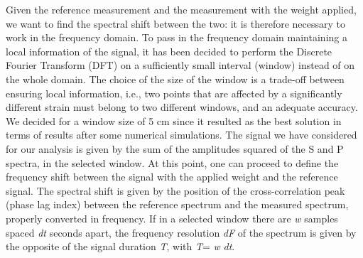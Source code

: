 Given the reference measurement and the measurement with the weight applied, we want to find the spectral shift between the two: it is therefore necessary to work in the frequency domain.
To pass in the frequency domain maintaining a local information of the signal, it has been decided to perform the Discrete Fourier Transform (DFT) on a sufficiently small interval (window) instead of on the whole domain. The choice of the size of the window is a trade-off between ensuring local information, i.e., two points that are affected by a significantly different strain must belong to two different windows, and an adequate accuracy. We decided for a window size of 5 cm since it resulted as the best solution in terms of results after some numerical simulations.
The signal we have considered for our analysis is given by the sum of the amplitudes squared of the S and P spectra, in the selected window.
At this point, one can proceed to define the frequency shift between the signal with the applied weight and the reference signal. The spectral shift is given by the position of the cross-correlation peak (phase lag index) between the reference spectrum and the measured spectrum, properly converted in frequency.
If in a selected window there are \textit{w} samples spaced \textit{dt} seconds apart, the frequency resolution \textit{dF} of the spectrum is given by the opposite of the signal duration \textit{T}, with \textit{T}= \textit{w} \textit{dt}.


